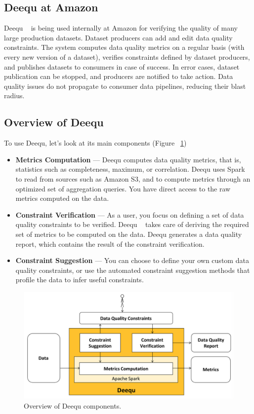 \subsection{Deequ at Amazon}

Deequ ~\cite{Schelter:2018:ALD:3229863.3275547} is being used internally at Amazon for verifying the quality of many large production datasets. Dataset producers can add and edit data quality constraints. The system computes data quality metrics on a regular basis (with every new version of a dataset), verifies constraints defined by dataset producers, and publishes datasets to consumers in case of success. In error cases, dataset publication can be stopped, and producers are notified to take action. Data quality issues do not propagate to consumer data pipelines, reducing their blast radius.
\subsection{Overview of Deequ}

To use Deequ, let's look at its main components (Figure ~\ref{fig:deeaqu})

\begin{itemize}
	\item {
		\textbf{Metrics Computation} — Deequ computes data quality metrics, that is, statistics such as completeness, maximum, or correlation. Deequ uses Spark to read from sources such as Amazon S3, and to compute metrics through an optimized set of aggregation queries. You have direct access to the raw metrics computed on the data.
	}
\item {
	\textbf{Constraint Verification} — As a user, you focus on defining a set of data quality constraints to be verified. Deequ ~\cite{Schelter:2018:ALD:3229863.3275547} takes care of deriving the required set of metrics to be computed on the data. Deequ generates a data quality report, which contains the result of the constraint verification.
}
\item {
	\textbf{Constraint Suggestion} — You can choose to define your own custom data quality constraints, or use the automated constraint suggestion methods that profile the data to infer useful constraints.
}
\end{itemize}

\begin{figure}[H]
	\centering
	\includegraphics[scale=.4]{deeaqu}
	\caption{Overview of Deequ components.}
	\label{fig:deeaqu}
\end{figure}

